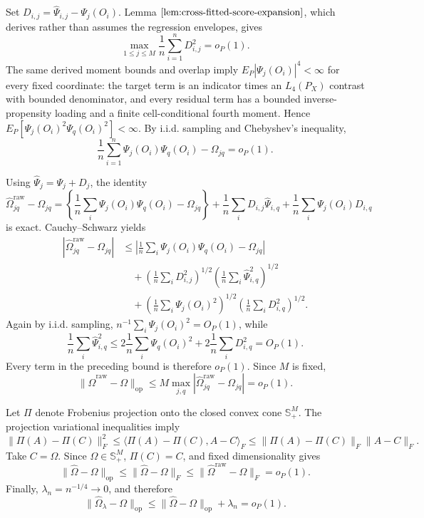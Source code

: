 Set \(D_{i,j}=\widehat\Psi_{i,j}-\Psi_j(O_i)\).  Lemma \(\ref{lem:cross-fitted-score-expansion}\), which derives rather than assumes the regression envelopes, gives
\[
 \max_{1\le j\le M}\frac1n\sum_{i=1}^nD_{i,j}^2=o_P(1).
\]
The same derived moment bounds and overlap imply \(E_P|\Psi_j(O_i)|^4<\infty\) for every fixed coordinate: the target term is an indicator times an \(L_4(P_X)\) contrast with bounded denominator, and every residual term has a bounded inverse-propensity loading and a finite cell-conditional fourth moment.  Hence \(E_P[\Psi_j(O_i)^2\Psi_q(O_i)^2]<\infty\).  By i.i.d. sampling and Chebyshev's inequality,
\[
 \frac1n\sum_{i=1}^n\Psi_j(O_i)\Psi_q(O_i)-\Omega_{jq}=o_P(1).
\]

Using \(\widehat\Psi_j=\Psi_j+D_j\), the identity
\[
 \widehat\Omega^{\mathrm{raw}}_{jq}-\Omega_{jq}
 =\left\{\frac1n\sum_i\Psi_j(O_i)\Psi_q(O_i)-\Omega_{jq}\right\}
 +\frac1n\sum_iD_{i,j}\widehat\Psi_{i,q}
 +\frac1n\sum_i\Psi_j(O_i)D_{i,q}
\]
is exact.  Cauchy--Schwarz yields
\[
\begin{aligned}
 |\widehat\Omega^{\mathrm{raw}}_{jq}-\Omega_{jq}|
 &\le \left|\frac1n\sum_i\Psi_j(O_i)\Psi_q(O_i)-\Omega_{jq}\right|\\
 &\quad+\left(\frac1n\sum_iD_{i,j}^2\right)^{1/2}
       \left(\frac1n\sum_i\widehat\Psi_{i,q}^2\right)^{1/2}\\
 &\quad+\left(\frac1n\sum_i\Psi_j(O_i)^2\right)^{1/2}
       \left(\frac1n\sum_iD_{i,q}^2\right)^{1/2}.
\end{aligned}
\]
Again by i.i.d. sampling, \(n^{-1}\sum_i\Psi_j(O_i)^2=O_P(1)\), while
\[
 \frac1n\sum_i\widehat\Psi_{i,q}^2
 \le2\frac1n\sum_i\Psi_q(O_i)^2+2\frac1n\sum_iD_{i,q}^2=O_P(1).
\]
Every term in the preceding bound is therefore \(o_P(1)\).  Since \(M\) is fixed,
\[
 \|\widehat\Omega^{\mathrm{raw}}-\Omega\|_{\mathrm{op}}
 \le M\max_{j,q}|\widehat\Omega^{\mathrm{raw}}_{jq}-\Omega_{jq}|=o_P(1).
\]

Let \(\Pi\) denote Frobenius projection onto the closed convex cone \(\mathbb S_+^M\).  The projection variational inequalities imply
\[
 \|\Pi(A)-\Pi(C)\|_F^2
 \le\langle\Pi(A)-\Pi(C),A-C\rangle_F
 \le\|\Pi(A)-\Pi(C)\|_F\|A-C\|_F.
\]
Take \(C=\Omega\).  Since \(\Omega\in\mathbb S_+^M\), \(\Pi(C)=C\), and fixed dimensionality gives
\[
 \|\widehat\Omega-\Omega\|_{\mathrm{op}}
 \le\|\widehat\Omega-\Omega\|_F
 \le\|\widehat\Omega^{\mathrm{raw}}-\Omega\|_F=o_P(1).
\]
Finally, \(\lambda_n=n^{-1/4}\to0\), and therefore
\[
 \|\widehat\Omega_\lambda-\Omega\|_{\mathrm{op}}
 \le\|\widehat\Omega-\Omega\|_{\mathrm{op}}+\lambda_n=o_P(1).
\]